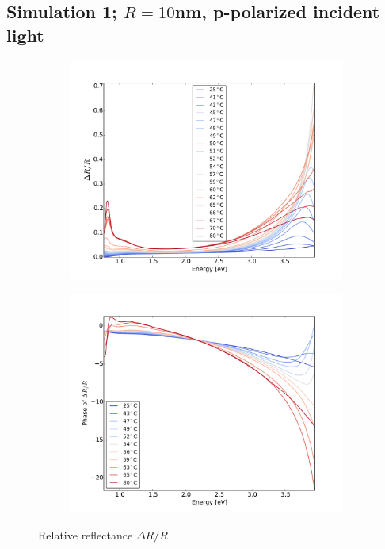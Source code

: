 \subsection{Simulation 1; $R = 10$nm, p-polarized incident light}
%
\begin{figure}
    \centering
    \begin{subfigure}[b]{0.49\textwidth}
        \centering
        \includegraphics[width=\textwidth]{Results/Sim1/dR.pdf}
        \caption{}
        \label{fig:}
    \end{subfigure}
    \begin{subfigure}[b]{0.49\textwidth}
        \centering
        \includegraphics[width=\textwidth]{Results/Sim1/dRphase.pdf}
        \caption{}
        \label{fig:}
    \end{subfigure}
    \caption{Relative reflectance $\Delta R/R$}
    \label{fig:1}
\end{figure}
